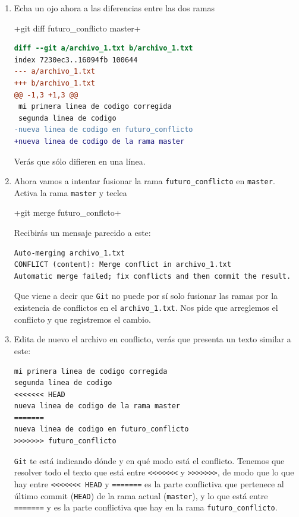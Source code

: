 \documentclass[a5paper,10pt]{article}
\begin{document}
\begin{enumerate}
     \item Echa un ojo ahora a las diferencias entre las dos ramas
     
     \cverb+git diff futuro_conflicto master+

    \begin{lstlisting}[language=diff]
diff --git a/archivo_1.txt b/archivo_1.txt
index 7230ec3..16094fb 100644
--- a/archivo_1.txt
+++ b/archivo_1.txt
@@ -1,3 +1,3 @@
 mi primera linea de codigo corregida
 segunda linea de codigo
-nueva linea de codigo en futuro_conflicto
+nueva linea de codigo de la rama master
    \end{lstlisting}
    Verás que sólo difieren en una línea.
    
    \item Ahora vamos a intentar fusionar la rama \verb+futuro_conflicto+ en \verb+master+. Activa la rama \verb+master+ y teclea
    
    \cverb+git merge futuro_conflcto+
    
    Recibirás un mensaje parecido a este:
    \begin{lstlisting}[style=custom]
Auto-merging archivo_1.txt
CONFLICT (content): Merge conflict in archivo_1.txt
Automatic merge failed; fix conflicts and then commit the result.
    \end{lstlisting}
    Que viene a decir que \verb+Git+ no puede por sí solo fusionar las ramas por la existencia de conflictos en el \verb+archivo_1.txt+. Nos pide que arreglemos el conflicto y que registremos el cambio.
    
    \item Edita de nuevo el archivo en conflicto, verás que presenta un texto similar a este:
    
    \begin{lstlisting}[style=custom]
mi primera linea de codigo corregida
segunda linea de codigo
<<<<<<< HEAD
nueva linea de codigo de la rama master
=======
nueva linea de codigo en futuro_conflicto
>>>>>>> futuro_conflicto
    \end{lstlisting}
    
    \verb+Git+ te está indicando dónde y en qué modo está el conflicto. Tenemos que resolver todo el texto que está entre \verb+<<<<<<<+ y \verb+>>>>>>>+, de modo que lo que hay entre \verb+<<<<<<< HEAD+ y \verb+=======+ es la parte conflictiva que pertenece al último commit (\verb+HEAD+) de la rama actual (\verb+master+), y lo que está entre \verb+=======+ y es la parte conflictiva que hay en la rama \verb+futuro_conflicto+.
    

\end{enumerate}
\end{document}
